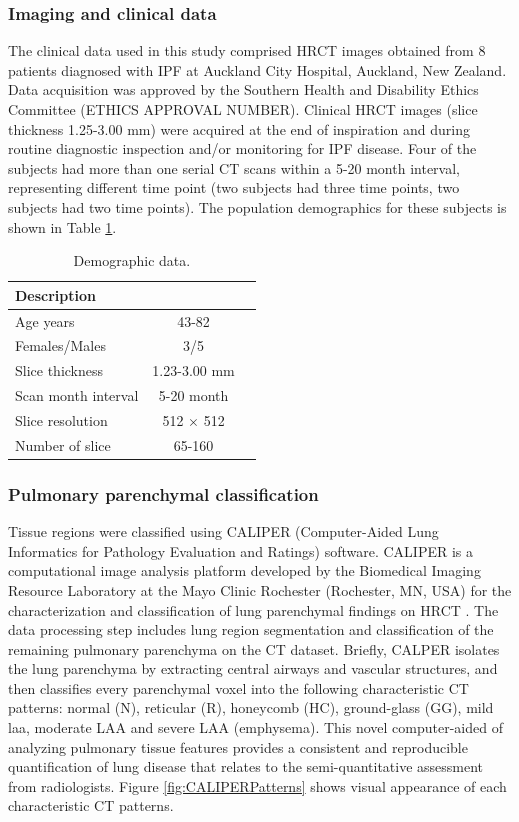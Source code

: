 \subsubsection{Imaging and clinical data}
The clinical data used in this study comprised HRCT images obtained from 8 patients diagnosed with IPF at Auckland City Hospital, Auckland, New Zealand. Data acquisition was approved by the Southern Health and Disability Ethics Committee (ETHICS APPROVAL NUMBER). Clinical HRCT images (slice thickness 1.25-3.00 mm) were acquired at the end of inspiration and during routine diagnostic inspection and/or monitoring for IPF disease. Four of the subjects had more than one serial CT scans within a 5-20 month interval, representing different time point (two subjects had three time points, two subjects had two time points). The population demographics for these subjects is shown in Table \ref{tab:DemographicData}.

\begin{table}[h]
\centering
\caption{Demographic data.}
\label{tab:DemographicData}
\begin{tabular}{| l  | c | c|}
\hline
{\bf Description}  \\ \hline
Age years & 43-82 \\
\hline
Females/Males	& 3/5 \\
\hline
Slice thickness	& 1.23-3.00 mm \\
\hline
Scan month interval	& 5-20 month \\
\hline
Slice resolution	& 512 $\times$ 512 \\
\hline
Number of slice	& 65-160
\\ \hline
\end{tabular}
\end{table}

\subsubsection{Pulmonary parenchymal classification}
Tissue regions were classified using CALIPER (Computer-Aided Lung Informatics for Pathology Evaluation and Ratings) software. CALIPER is a computational image analysis platform developed by the Biomedical Imaging Resource Laboratory at the Mayo Clinic Rochester (Rochester, MN, USA) for the characterization and classification of lung parenchymal findings on HRCT \citep{maldonado2013automated,bartholmai2013quantitative,raghunath2014quantitative}. The data processing step includes lung region segmentation and classification of the remaining pulmonary parenchyma on the CT dataset. Briefly, CALPER isolates the lung parenchyma by extracting central airways and vascular structures, and then classifies every parenchymal voxel into the following characteristic CT patterns: normal (N), reticular (R), honeycomb (HC), ground-glass (GG), mild \gls{laa}, moderate LAA and severe LAA (emphysema). This novel computer-aided of analyzing pulmonary tissue features provides a consistent and reproducible quantification of lung disease that relates to the semi-quantitative assessment from radiologists\citep{maldonado2013automated}. Figure \ref{fig:CALIPERPatterns} shows visual appearance of each characteristic CT patterns.

